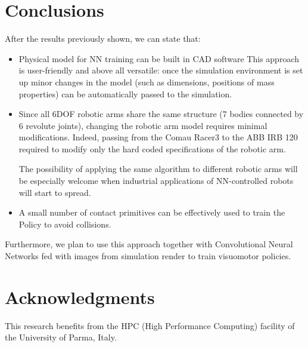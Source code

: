 \documentclass{sig-alternate-05-2015}
\begin{document}
\section{Conclusions}
After the results previously shown, we can state that:
\begin{itemize}
    \item Physical model for NN training can be built in CAD software This approach is user-friendly and above all versatile: once the simulation environment is set up minor changes in the model (such as dimensions, positions of mass properties) can be automatically passed to the simulation.
    \item Since all 6DOF robotic arms share the same structure (7 bodies connected by 6 revolute joints), changing the robotic arm model requires minimal modifications.
    Indeed, passing from the Comau Racer3 to the ABB IRB 120 required to modify only the hard coded specifications of the robotic arm. 
    
    The possibility of applying the same algorithm to different robotic arms will be especially welcome when industrial applications of NN-controlled robots will start to spread.
    \item A small number of contact primitives can be effectively used to train the Policy to avoid collisions.
    
\end{itemize}

Furthermore, we plan to use this approach together with Convolutional Neural Networks fed with  images from simulation render to train visuomotor policies.


\section{Acknowledgments}

This research benefits from the HPC (High Performance Computing) facility of the University of Parma, Italy.


\printbibliography
\end{document}
